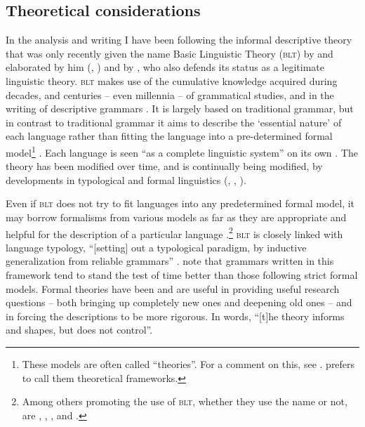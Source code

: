 \subsection{Theoretical considerations}
In the analysis and writing I have been following the informal descriptive theory that was only recently given the name Basic Linguistic Theory (\textsc{blt}) by \citet{Dixon1997} and elaborated by him (\citeyear{Dixon2010a}, \citeyear{Dixon2010b}) and by \citet{Dryer2006a, Dryer2006b}, who also defends its status as a legitimate linguistic theory. \textsc{blt} makes use of the cumulative knowledge acquired during decades, and centuries -- even millennia -- of grammatical studies, and in the writing of descriptive grammars \citep[3]{Dixon2010a}. It is largely based on traditional grammar, but in contrast to traditional grammar it aims to describe the `essential nature' of each language rather than fitting the language into a pre-determined formal model\footnote{These models are often called ``theories''.  For a comment on this, see \citet[131]{Dixon1997}. \citet{Dryer2006a} prefers to call them theoretical frameworks.} \citep[211]{Dryer2006a}. Each language is seen ``as a complete linguistic system'' on its own \citep[4]{Dixon2010a}. The theory has been modified over time, and is continually being modified, by developments in typological and formal linguistics (\citealt{EvansEtAl2006}, \citealt{Rice2006a, Rice2006b}, \citealt[3]{Dixon2010a}).  

Even if \textsc{blt} does not try to fit languages into any predetermined formal model, it may borrow formalisms from various models as far as they are appropriate and helpful for the description of a particular language \citep[128--135]{Dixon1997}.\footnote{Among others promoting the use of \textsc{blt}, whether they use the name or not, are
\citet[354]{Noonan2006}, 
\citet{Rice2006a, Rice2006b}, 
\citet{EvansEtAl2006}, and \citet{Payne1997, Payne2006}.}  \textsc{blt} is closely linked with language typology, ``[setting] out a typological paradigm, by inductive generalization from reliable grammars'' \citep[205]{Dixon2010a}. \citet[6]{EvansEtAl2006} note that grammars written in this framework tend to stand the test of time better than those following strict formal models. Formal theories have been and are useful in providing useful research questions -- both bringing up completely new ones and deepening old ones -- and in forcing the descriptions to be more rigorous. In  words, ``[t]he theory informs and shapes, but does not control''. 




